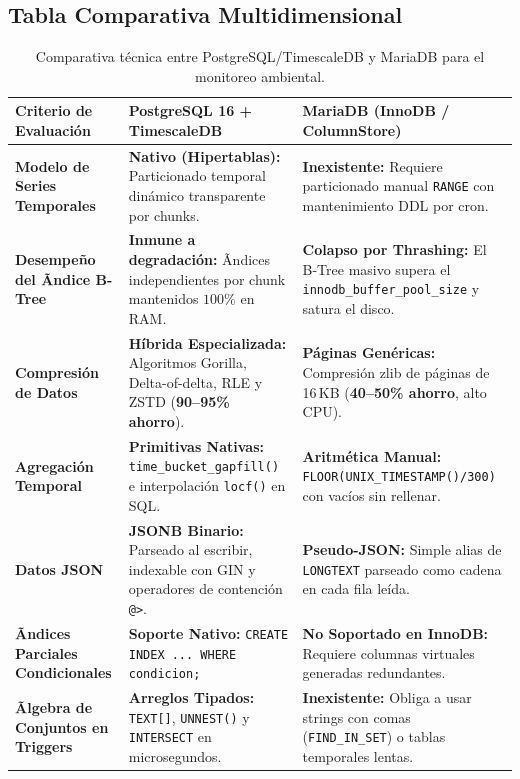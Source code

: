 \documentclass[11pt,a4paper]{article}
\begin{document}
\subsection{Tabla Comparativa Multidimensional}

\begin{table}[H]
\centering
\small
\renewcommand{\arraystretch}{1.2}
\begin{tabularx}{\linewidth}{p{3.2cm}X X}
\toprule
\textbf{Criterio de Evaluación} & \textbf{PostgreSQL 16 + TimescaleDB} & \textbf{MariaDB (InnoDB / ColumnStore)} \\
\midrule
\textbf{Modelo de Series Temporales} & 
\textbf{Nativo (Hipertablas):} Particionado temporal dinámico transparente por chunks. & 
\textbf{Inexistente:} Requiere particionado manual \texttt{RANGE} con mantenimiento DDL por cron. \\

\textbf{Desempeño del Ãndice B-Tree} & 
\textbf{Inmune a degradación:} Ãndices independientes por chunk mantenidos $100\%$ en RAM. & 
\textbf{Colapso por Thrashing:} El B-Tree masivo supera el \texttt{innodb\_buffer\_pool\_size} y satura el disco. \\

\textbf{Compresión de Datos} & 
\textbf{Híbrida Especializada:} Algoritmos Gorilla, Delta-of-delta, RLE y ZSTD (\textbf{90--95\% ahorro}). & 
\textbf{Páginas Genéricas:} Compresión zlib de páginas de 16\,KB (\textbf{40--50\% ahorro}, alto CPU). \\

\textbf{Agregación Temporal} & 
\textbf{Primitivas Nativas:} \texttt{time\_bucket\_gapfill()} e interpolación \texttt{locf()} en SQL. & 
\textbf{Aritmética Manual:} \texttt{FLOOR(UNIX\_TIMESTAMP()/300)} con vacíos sin rellenar. \\

\textbf{Datos JSON} & 
\textbf{JSONB Binario:} Parseado al escribir, indexable con GIN y operadores de contención \texttt{@>}. & 
\textbf{Pseudo-JSON:} Simple alias de \texttt{LONGTEXT} parseado como cadena en cada fila leída. \\

\textbf{Ãndices Parciales Condicionales} & 
\textbf{Soporte Nativo:} \texttt{CREATE INDEX ... WHERE condicion;} & 
\textbf{No Soportado en InnoDB:} Requiere columnas virtuales generadas redundantes. \\

\textbf{Ãlgebra de Conjuntos en Triggers} & 
\textbf{Arreglos Tipados:} \texttt{TEXT[]}, \texttt{UNNEST()} y \texttt{INTERSECT} en microsegundos. & 
\textbf{Inexistente:} Obliga a usar strings con comas (\texttt{FIND\_IN\_SET}) o tablas temporales lentas. \\
\bottomrule
\end{tabularx}
\caption{Comparativa técnica entre PostgreSQL/TimescaleDB y MariaDB para el monitoreo ambiental.}
\label{tab:comparativa_db}
\end{table}
\end{document}
